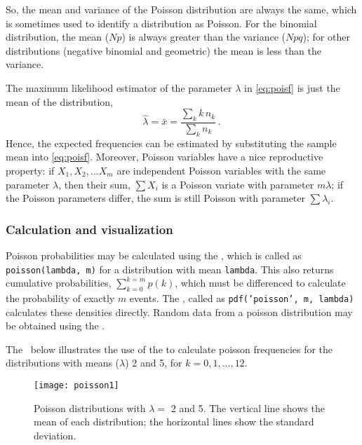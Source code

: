 So, the mean and variance of the Poisson distribution are always
the same, which is sometimes used to identify a distribution
as Poisson.  For the binomial distribution, the mean ($Np$) is always
greater than the variance ($Npq$); for other distributions
(negative binomial and geometric) the mean is less than the
variance.

The maximum likelihood estimator of the parameter \(\lambda\)
in \eqref{eq:poisf} is just
the mean of the distribution,
\begin{equation*}
  \hat{\lambda}= \bar{x} = \frac{\sum_k k \,  n_k}{\sum_k  n_k}
  \period
\end{equation*}
Hence, the expected frequencies can be estimated by substituting the
sample mean into \eqref{eq:poisf}.
Moreover, Poisson variables have a nice reproductive property:
 if $X_1, X_2, \dots X_m$ are independent Poisson
variables with the same parameter $\lambda$, then their
sum, $\sum X_i$ is a Poisson variate with parameter $m \lambda$;
if the Poisson parameters differ, the sum is still Poisson with
parameter $\sum \lambda_i$.



\subsubsection{Calculation and visualization}
Poisson probabilities may be calculated using the ,
which is called as \texttt{poisson(lambda, m)} for a distribution
with mean \texttt{lambda}.
This also returns cumulative probabilities,
$ \sum_{k=0}^{k=m} p ( k )$,
which must be differenced to calculate the probability of exactly
$m$ events.  The , called as \texttt{pdf('poisson', m, lambda)}
calculates these densities directly.
Random data from a poisson distribution may be obtained using the
.

The \Dstp\ below illustrates the use of the  to calculate
poisson frequencies for the distributions with means ($\lambda$) 2 and 5,
for $k = 0, 1, \dots , 12$.


\begin{figure}[htb]
  \centering
  \texttt{[image: poisson1]}
  \caption[Poisson distributions with $\lambda =$ 2, 5.]{Poisson distributions with $\lambda =$ 2 and 5.  The vertical line shows the mean
  of each distribution; the horizontal lines show the standard deviation.}%
  \label{fig:poisson1}
\end{figure}

